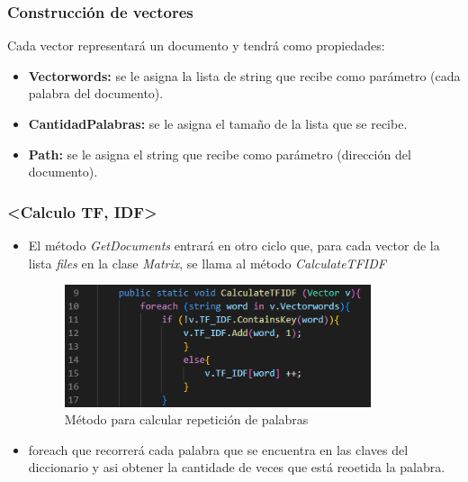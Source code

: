 \documentclass{beamer}
\begin{document}
\begin{frame}
    \frametitle{Construcción de vectores}

    Cada vector representará un documento y tendrá como propiedades:

        \begin{itemize}
            \item  \textbf{Vectorwords:} se le asigna la lista de string que recibe como parámetro (cada palabra del documento).
            \item  \textbf{CantidadPalabras:} se le asigna el tamaño de la lista que se recibe.
            \item  \textbf{Path:} se le asigna el string que recibe como parámetro (dirección del documento).
        \end{itemize}

\end{frame}

\begin{frame}
    \frametitle{<Calculo TF, IDF>}

    \begin{itemize}
        \item El método \textit{GetDocuments} entrará en otro ciclo que, para cada vector de la lista \textit{files} en la clase \textit{Matrix}, 
        se llama al método \textit{CalculateTFIDF}

        \begin{figure}[h]

            \centering
            \label{imag: calculoTFIDF}
            \includegraphics[width=9cm]{CalcularTFIDF.png}
            \caption[]{ \footnotesize Método para calcular repetición de palabras}
        
        \end{figure}

        \item foreach que recorrerá cada palabra que se encuentra en las claves del diccionario y asi obtener la cantidade
        de veces que está reoetida la palabra.

    \end{itemize}

\end{frame}
\end{document}
